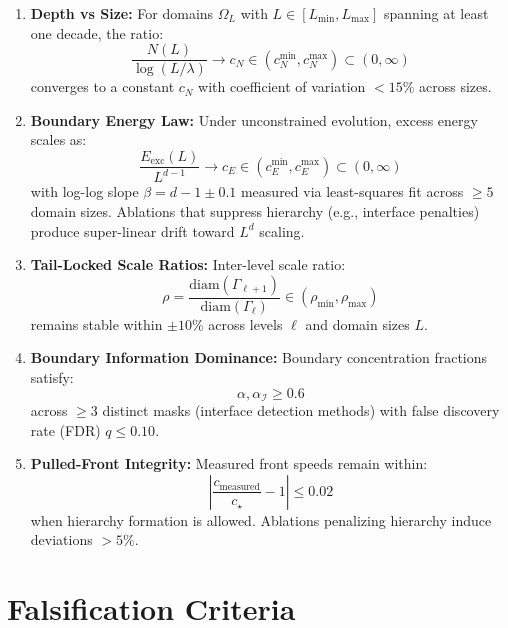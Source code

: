 \documentclass{article}
\begin{document}
\begin{enumerate}[label=\textbf{P\arabic*.},leftmargin=*]
\item \textbf{Depth vs Size:} For domains $\Omega_L$ with $L \in [L_{\min}, L_{\max}]$ spanning at least one decade, the ratio:
\begin{equation}
\frac{N(L)}{\log(L/\lambda)} \to c_N \in (c_N^{\min}, c_N^{\max}) \subset (0, \infty)
\end{equation}
converges to a constant $c_N$ with coefficient of variation $< 15\%$ across sizes.

\item \textbf{Boundary Energy Law:} Under unconstrained evolution, excess energy scales as:
\begin{equation}
\frac{E_{\text{exc}}(L)}{L^{d-1}} \to c_E \in (c_E^{\min}, c_E^{\max}) \subset (0, \infty)
\end{equation}
with log-log slope $\beta = d-1 \pm 0.1$ measured via least-squares fit across $\geq 5$ domain sizes. Ablations that suppress hierarchy (e.g., interface penalties) produce super-linear drift toward $L^d$ scaling.

\item \textbf{Tail-Locked Scale Ratios:} Inter-level scale ratio:
\begin{equation}
\rho = \frac{\text{diam}(\Gamma_{\ell+1})}{\text{diam}(\Gamma_\ell)} \in (\rho_{\min}, \rho_{\max})
\end{equation}
remains stable within $\pm 10\%$ across levels $\ell$ and domain sizes $L$.

\item \textbf{Boundary Information Dominance:} Boundary concentration fractions satisfy:
\begin{equation}
\alpha, \alpha_{\mathcal{I}} \geq 0.6
\end{equation}
across $\geq 3$ distinct masks (interface detection methods) with false discovery rate (FDR) $q \leq 0.10$.

\item \textbf{Pulled-Front Integrity:} Measured front speeds remain within:
\begin{equation}
\left| \frac{c_{\text{measured}}}{c_\star} - 1 \right| \leq 0.02
\end{equation}
when hierarchy formation is allowed. Ablations penalizing hierarchy induce deviations $> 5\%$.
\end{enumerate}

\section{Falsification Criteria}
\label{sec:falsifiers}
\end{document}
